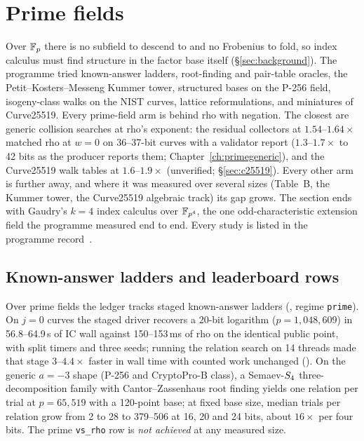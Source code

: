 \chapter{Prime fields}\label{sec:prime}

Over $\mathbb{F}_p$ there is no subfield to descend to and no Frobenius to fold,
so index calculus must find structure in the factor base itself
(\S\ref{sec:background}). The programme tried known-answer ladders,
root-finding and pair-table oracles, the Petit--Kosters--Messeng Kummer
tower, structured bases on the P-256 field, isogeny-class walks on the NIST
curves, lattice reformulations, and miniatures of Curve25519. Every
prime-field arm is behind rho with negation. The closest are generic
collision searches at rho's exponent: the residual collectors at
$1.54$--$1.64\times$ matched rho at $w=0$ on 36--37-bit curves with a
validator report ($1.3$--$1.7\times$ to 42 bits as the producer reports
them; Chapter~\ref{ch:primegeneric}), and the Curve25519 walk tables at
$1.6$--$1.9\times$ (unverified; \S\ref{sec:c25519}). Every other arm is
further away, and where it was measured over several sizes (Table~B, the
Kummer tower, the Curve25519 algebraic track) its gap grows. The section ends with Gaudry's $k=4$ index calculus over
$\mathbb{F}_{p^4}$, the one odd-characteristic extension field the programme
measured end to end. Every study is listed in the programme record~\cite{icprogram2026}.

\section{Known-answer ladders and leaderboard rows}

Over prime fields the ledger tracks staged known-answer ladders
(, regime \texttt{prime}). On $j=0$
curves the staged driver recovers a 20-bit logarithm
($p=1{,}048{,}609$) in 56.8--64.9\,s of IC wall against 150--153\,ms of rho
on the identical public point, with split timers and three seeds; running
the relation search on 14 threads made that stage $3$--$4.4\times$ faster in
wall time with counted work unchanged
(). On the generic $a=-3$
shape (P-256 and CryptoPro-B class), a Semaev-$S_{4}$ three-decomposition
family with Cantor--Zassenhaus root finding yields one relation per trial at
$p=65{,}519$ with a 120-point base; at fixed base size, median trials per
relation grow from 2 to 28 to 379--506 at 16, 20 and 24 bits, about
$16\times$ per four bits. The prime \texttt{vs\_rho} row is \emph{not
achieved} at any measured size.

